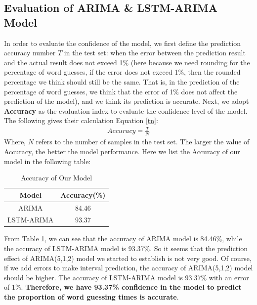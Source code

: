 \documentclass[12pt]{article}  %
\begin{document}
\subsection{Evaluation of ARIMA \& LSTM-ARIMA Model}
In order to evaluate the confidence of the model, we first define the prediction accuracy number $T$ in the test set: when the error between the prediction result and the actual result does not exceed 1\% (here because we need rounding for the percentage of word guesses, if the error does not exceed 1\%, then the rounded percentage we think should still be the same. That is, in the prediction of the percentage of word guesses, we think that the error of 1\% does not affect the prediction of the model), and we think its prediction is accurate. Next, we adopt \textbf{Accuracy} as the evaluation index to evaluate the confidence level of the model. The following gives their calculation Equation \ref{tn}:
\begin{eqnarray}
Accuracy=\frac{T}{N}\label{tn}
\end{eqnarray}
Where, $N$ refers to the number of samples in the test set. The larger the value of Accuracy, the better the model performance. Here we list the Accuracy of our model in the following table:
\begin{table}[!h]
\begin{center}
\caption{Accuracy of Our Model}\label{acc}
\begin{tabular}{cc}
\hline
\textbf{Model}&\textbf{Accuracy(\%)}\\ \hline
ARIMA&84.46\\
LSTM-ARIMA&93.37\\\hline
\end{tabular}
\end{center}
\end{table}

From Table \ref{acc}, we can see that the accuracy of ARIMA model is 84.46\%, while the accuracy of LSTM-ARIMA model is 93.37\%. So it seems that the prediction effect of ARIMA(5,1,2) model we started to establish is not very good. Of course, if we add errors to make interval prediction, the accuracy of ARIMA(5,1,2) model should be higher. The accuracy of LSTM-ARIMA model is 93.37\% with an error of 1\%. \textbf{Therefore, we have 93.37\% confidence in the model to predict the proportion of word guessing times is accurate}.
\end{document}
